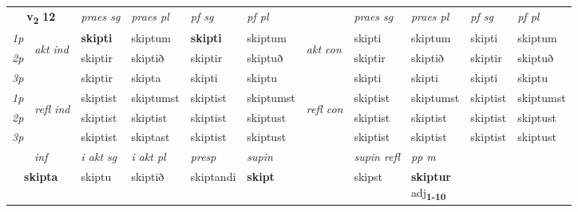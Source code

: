 \noindent
\begin{tabular}{lllllllllll} \toprule
\multicolumn{2}{c}{\textbf{v{\textsubscript{2}}} \Large{\textbf{12}}}  &  \textit{praes sg}  & \textit{praes pl}  &\textit{ pf sg} & \textit{pf pl} &  &  \textit{praes sg}  & \textit{praes pl}  & \textit{pf sg} & \textit{pf pl } \\*
	\cmidrule{3-6} \cmidrule{8-11}
 {\textit{1p}} & \multirow{3}{*}{\begin{turn}{90}\textit{akt ind}\end{turn}} & \textbf{skipti} & skiptum & \textbf{skipti} & skiptum & \multirow{3}{*}{\begin{turn}{90}\textit{akt con}\end{turn}} &skipti & skiptum & skipti & skiptum\\*
 {\textit{2p}} &  &  skiptir  & skiptið & skiptir & skiptuð & & skiptir & skiptið & skiptir & skiptuð \\*
{\textit{3p}} &  & skiptir & skipta & skipti & skiptu & & skipti & skipti& skipti & skiptu \\*
\cmidrule{3-6} \cmidrule{8-11}
 {\textit{1p}} & \multirow{3}{*}{\begin{turn}{90}\textit{refl ind}\end{turn}}  & skiptist & skiptumst & skiptist & skiptumst & \multirow{3}{*}{\begin{turn}{90}\textit{refl con}\end{turn}}  &skiptist & skiptumst & skiptist & skiptumst \\*
 {\textit{2p}} &  & skiptist & skiptist & skiptist & skiptust & &skiptist & skiptist & skiptist & skiptust \\*
 {\textit{3p}}  & & skiptist & skiptast & skiptist & skiptust & & skiptist & skiptist& skiptist & skiptust \\*
\cmidrule{3-6} \cmidrule{8-11}

   \multicolumn{2}{c}{\textit{inf}}  & \textit{i akt sg} & \textit{i akt pl}   & \textit{presp} & \textit{supin} && \textit{supin refl} & \textit{pp m} \\*
  \multicolumn{2}{c}{\textbf{skipta}} & skiptu  & skiptið   & skiptandi &  \textbf{skipt} && skipst & \specialcell{\textbf{skiptur} \\ adj\textbf{\textsubscript{1-10}}} \\*
\end{tabular}

